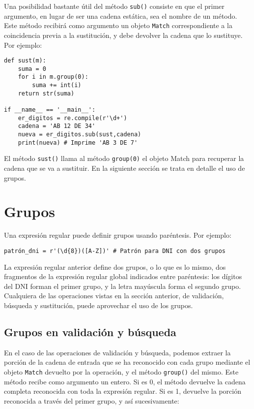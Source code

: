Una posibilidad bastante útil del método \texttt{sub()} consiste en que el primer argumento, en lugar de ser una cadena estática, sea el nombre de un método. Este método recibirá como argumento un objeto \texttt{Match} correspondiente a la coincidencia previa a la sustitución, y debe devolver la cadena que lo sustituye. Por ejemplo:

\begin{lstlisting}
def sust(m):
    suma = 0
    for i in m.group(0):
        suma += int(i)
    return str(suma) 

if __name__ == '__main__':
    er_digitos = re.compile(r'\d+')
    cadena = 'AB 12 DE 34'
    nueva = er_digitos.sub(sust,cadena)
    print(nueva) # Imprime 'AB 3 DE 7'
\end{lstlisting}

El método \texttt{sust()} llama al método \texttt{group(0)} el objeto Match para recuperar la cadena que se va a sustituir. En la siguiente sección se trata en detalle el uso de grupos.

\section{Grupos}

Una expresión regular puede definir grupos usando paréntesis. Por ejemplo:

\begin{lstlisting}
patrón_dni = r'(\d{8})([A-Z])' # Patrón para DNI con dos grupos
\end{lstlisting}

La expresión regular anterior define dos grupos, o lo que es lo mismo, dos fragmentos de la expresión regular global indicados entre paréntesis: los dígitos del DNI forman el primer grupo, y la letra mayúscula forma el segundo grupo. Cualquiera de las operaciones vistas en la sección anterior, de validación, búsqueda y sustitución, puede aprovechar el uso de los grupos. 

\subsection{Grupos en validación y búsqueda}

En el caso de las operaciones de validación y búsqueda, podemos extraer la porción de la cadena de entrada que se ha reconocido con cada grupo mediante el objeto \texttt{Match} devuelto por la operación, y el método \texttt{group()} del mismo. Este método recibe como argumento un entero. Si es 0, el método devuelve la cadena completa reconocida con toda la expresión regular. Si es 1, devuelve la porción reconocida a través del primer grupo, y así sucesivamente:

